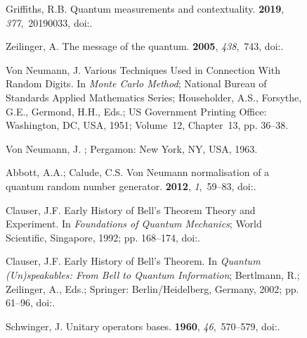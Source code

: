 \documentclass[entropy,article,accept,oneauthor,pdftex]{Definitions/mdpi}
\begin{document}
\begin{figure}[H]
\begin{thebibliography}{999}
Griffiths, R.B.
\newblock Quantum measurements and contextuality.
 {\bf 2019}, {\em 377},~20190033, doi:{\href{https://doi.org/10.1098/rsta.2019.0033}{}}.

Zeilinger, A.
\newblock The message of the quantum.
 {\bf 2005}, {\em 438},~743, doi:{\href{https://doi.org/10.1038/438743a}{}}.

Von Neumann, J.
\newblock Various Techniques Used in Connection With Random Digits. In {\em
  Monte Carlo Method}; National Bureau of Standards Applied Mathematics Series; Householder, A.S., Forsythe, G.E., Germond, H.H., Eds.; US Government Printing Office: Washington, DC, USA, 1951; Volume~12, Chapter~13, pp. 36--38.

{Von Neumann}, J.
; Pergamon: New York, NY, USA,  1963.

Abbott, A.A.; Calude, C.S.
\newblock Von {N}eumann normalisation of a quantum random number generator.
 {\bf 2012}, {\em 1},~59--83, doi:{\href{https://doi.org/10.3233/COM-2012-001}{}}.

Clauser, J.F.
\newblock Early History of {B}ell's Theorem Theory and Experiment. In {\em
  Foundations of Quantum Mechanics}; World Scientific, Singapore, 1992; pp. 168--174, doi:{\href{https://doi.org/10.1142/9789814436687_0020}{}}.

Clauser, J.F.
\newblock Early History of {B}ell's Theorem. In {\em Quantum (Un)speakables:
  {F}rom {B}ell to Quantum Information}; Bertlmann, R.; Zeilinger, A., Eds.;
  Springer: Berlin/Heidelberg, Germany, 2002; pp. 61--96, doi:{\href{https://doi.org/10.1007/978-3-662-05032-3\_6}{}}.

Schwinger, J.
\newblock Unitary operators bases.
 {\bf 1960}, {\em 46},~570--579, doi:{\href{https://doi.org/10.1073/pnas.46.4.570}{}}.


\end{thebibliography}
\end{figure}
\end{document}
